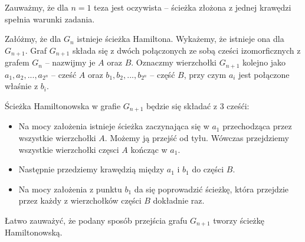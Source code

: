 Zauważmy, że dla $n = 1$ teza jest oczywista -- ścieżka złożona z jednej krawędzi spełnia warunki zadania.

Załóżmy, że dla $G_n$ istnieje ścieżka Hamiltona. Wykażemy, że istnieje ona dla $G_{n + 1}$. Graf $G_{n+1}$ składa się z dwóch połączonych ze sobą cześci izomorficznych z grafem $G_n$ -- nazwijmy je $A$ oraz $B$. Oznaczmy wierzchołki $G_{n + 1}$ kolejno jako
$a_1, a_2, ..., a_{2^n}$ -- cześć $A$ oraz $b_1, b_2, ..., b_{2^n}$ -- część $B$, przy czym $a_i$ jest połączone właśnie z $b_i$. 

Ścieżka Hamiltonowska w grafie $G_{n + 1}$ będzie się składać z 3 cześći:

\begin{itemize}
	\item Na mocy założenia istnieje ścieżka zaczynająca się w $a_1$ przechodząca przez wszystkie wierzchołki $A$. Możemy ją przejść od tyłu. Wówczas przejdziemy wszystkie wierzchołki częsci $A$ kończąc w $a_1$.
	\item Następnie przedziemy krawędzią między $a_1$ i $b_1$ do części $B$.
	\item Na mocy założenia z punktu $b_1$ da się poprowadzić ścieżkę, która przejdzie przez każdy z wierzchołków części $B$ dokładnie raz.
\end{itemize}

\noindent
Łatwo zauważyć, że podany sposób przejścia grafu $G_{n + 1}$ tworzy ścieżkę Hamiltonowską.

\newpage

